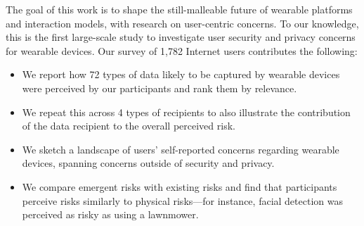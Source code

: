 The goal of this work is to shape the still-malleable future of wearable platforms and interaction models, with research on user-centric concerns. To our knowledge, this is the first large-scale study to investigate user security and privacy concerns for wearable devices. Our survey of 1,782 Internet users contributes the following: %

\begin{itemize} \itemsep1pt \parskip0pt 
\item We report how 72 types of data likely to be captured by wearable devices were perceived by our participants and rank them by relevance. 
\item We repeat this across 4 types of recipients to also illustrate the contribution of the data recipient to the overall perceived risk. 
\item We sketch a landscape of users' self-reported concerns regarding wearable devices, spanning concerns outside of security and privacy. 
\item We compare emergent risks with existing risks and find that participants perceive risks similarly to physical risks---for instance, facial detection was perceived as risky as using a lawnmower.
\end{itemize}
